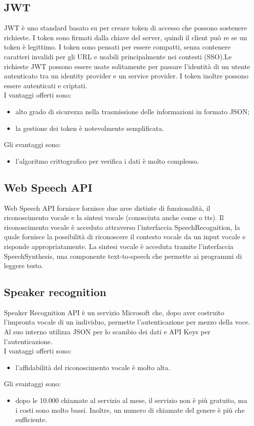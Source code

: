 \subsection{JWT}
JWT è uno standard basato su  per creare token di accesso che possono sostenere richieste. I token sono firmati dalla chiave del server, quindi il client può re se un token è legittimo. I token sono pensati per essere compatti, senza contenere caratteri invalidi per gli URL e usabili principalmente nei contesti  (SSO).Le richieste JWT possono essere usate solitamente per passare l'identità di un utente autenticato tra un identity provider e un service provider. I token inoltre possono essere autenticati e criptati.\\
I vantaggi offerti sono:
\begin{itemize}
	\item alto grado di sicurezza nella trasmissione delle informazioni in formato JSON;
	\item la gestione dei token è notevolmente semplificata.
\end{itemize}
Gli svantaggi sono:
\begin{itemize}
	\item l'algoritmo crittografico per verifica i dati è molto complesso.
\end{itemize}
\subsection{Web Speech API}
Web Speech API fornisce fornisce due aree distinte di funzionalità, il riconoscimento vocale e la sintesi vocale (conosciuta anche come  o tts).
Il riconoscimento vocale è acceduto attraverso l'interfaccia SpeechRecognition, la quale fornisce la possibilità di riconoscere il contesto vocale da un input vocale e risponde appropriatamente. 
La sintesi vocale è acceduta tramite l'interfaccia SpeechSynthesis, una componente text-to-speech che permette ai programmi di leggere testo.

\subsection{Speaker recognition}
Speaker Recognition API è un servizio Microsoft che, dopo aver costruito l'impronta vocale di un individuo, permette l'autenticazione per mezzo della voce. Al suo interno utilizza JSON per lo scambio dei dati e API Keys per l'autenticazione.
\\
I vantaggi offerti sono:
\begin{itemize}
	\item l'affidabilità del riconoscimento vocale è molto alta.
\end{itemize}
Gli svantaggi sono:
\begin{itemize}
	\item dopo le 10.000 chiamate al servizio al mese, il servizio non è più gratuito, ma i costi sono molto bassi. Inoltre, un numero di chiamate del genere è più che sufficiente.
\end{itemize}
